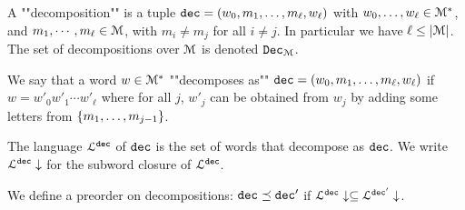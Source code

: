 \begin{definition}
	A ""decomposition"" is a tuple $\mathtt{dec} = (w_0, m_1, \ldots, m_\ell, w_\ell)$ with $w_0, \ldots, w_\ell \in \mathcal{M}^*$, and $m_1, \cdots, m_\ell \in \mathcal{M}$, with $m_i \neq m_j$ for all $i\neq j$. In particular we have $\ell \leq |\mathcal{M}|$. The set of decompositions over $\mathcal{M}$ is denoted $\mathtt{Dec}_{\mathcal{M}}$.
	
	We say that a word $w \in \mathcal{M}^*$ ""decomposes as"" $\mathtt{dec} = (w_0, m_1, \ldots, m_\ell, w_\ell)$ if $w = w'_0 w'_1 \cdots w'_\ell$ where for all $j$, $w'_j$ can be obtained from $w_j$ by adding some letters from $\{m_1, \ldots, m_{j-1}\}$.
	
	The language $\mathcal{L}^{\mathtt{\mathtt{dec}}}$ of $\mathtt{dec}$ is the set of words that decompose as $\mathtt{dec}$. We write $\mathcal{L}^{\mathtt{\mathtt{dec}}}\downarrow$ for the subword closure of $\mathcal{L}^{\mathtt{\mathtt{dec}}}$.
	
	We define a preorder on decompositions:
	$\mathtt{dec} \preceq \mathtt{dec}'$ if $\mathcal{L}^{\mathtt{\mathtt{dec}}}\downarrow \subseteq \mathcal{L}^{\mathtt{\mathtt{dec}'}}\downarrow$.
\end{definition}


